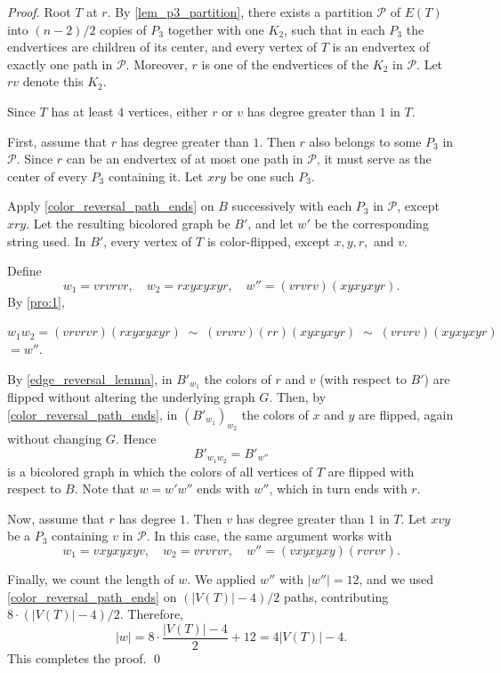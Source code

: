 \documentclass[runningheads,orivec]{llncs}
\begin{document}
\begin{proof}
Root $T$ at $r$. By \autoref{lem_p3_partition}, there exists a partition $\mathcal{P}$ of $E(T)$ into $(n-2)/2$ copies of $P_3$ together with one $K_2$, such that in each $P_3$ the endvertices are children of its center, and every vertex of $T$ is an endvertex of exactly one path in $\mathcal{P}$. Moreover, $r$ is one of the endvertices of the $K_2$ in $\mathcal{P}$. Let $rv$ denote this $K_2$.  

Since $T$ has at least $4$ vertices, either $r$ or $v$ has degree greater than $1$ in $T$.  

First, assume that $r$ has degree greater than $1$.
Then $r$ also belongs to some $P_3$ in $\mathcal{P}$. Since $r$ can be an endvertex of at most one path in $\mathcal{P}$, it must serve as the center of every $P_3$ containing it. Let $xry$ be one such $P_3$.

Apply \autoref{color_reversal_path_ends} on $B$ successively with each $P_3$ in $\mathcal{P}$, except $xry$. Let the resulting bicolored graph be $B'$, and let $w'$ be the corresponding string used. In $B'$, every vertex of $T$ is color-flipped, except $x,y,r,$ and $v$.  

Define
\[
w_1 = vrvrvr, \quad w_2 = rxyxyxyr, \quad w'' = (vrvrv)(xyxyxyr).
\]
By \autoref{pro:1},


\noindent$ w_1w_2 = (vrvrvr)(rxyxyxyr) \;\sim\; (vrvrv)(rr)(xyxyxyr) \;\sim\; (vrvrv)(xyxyxyr)$\\$ = w''.$

By \autoref{edge_reversal_lemma}, in $B'_{w_1}$ the colors of $r$ and $v$ (with respect to $B'$) are flipped without altering the underlying graph $G$. Then, by \autoref{color_reversal_path_ends}, in $(B'_{w_1})_{w_2}$ the colors of $x$ and $y$ are flipped, again without changing $G$. Hence 
\[
B'_{w_1w_2} = B'_{w''}
\] 
is a bicolored graph in which the colors of all vertices of $T$ are flipped with respect to $B$. Note that $w = w'w''$ ends with $w''$, which in turn ends with $r$.  


Now, assume that $r$ has degree $1$.  
Then $v$ has degree greater than $1$ in $T$. Let $xvy$ be a $P_3$ containing $v$ in $\mathcal{P}$. In this case, the same argument works with
\[
w_1 = vxyxyxyv, \quad w_2 = vrvrvr, \quad w'' = (vxyxyxy)(rvrvr).
\]

Finally, we count the length of $w$. We applied $w''$ with $|w''|=12$, and we used \autoref{color_reversal_path_ends} on $(|V(T)|-4)/2$ paths, contributing $8 \cdot (|V(T)|-4)/2$. Therefore,
\[
|w| = 8\cdot \frac{|V(T)|-4}{2} + 12 = 4|V(T)| - 4.
\]
This completes the proof.
\qed
\end{proof}
\end{document}
